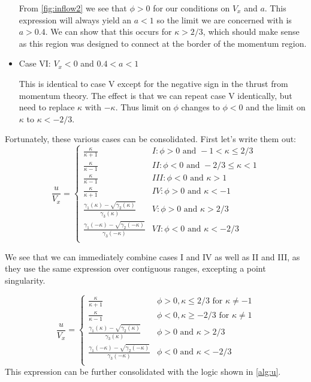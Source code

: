 \documentclass{article}
\begin{document}
\begin{itemize}
From \cref{fig:inflow2} we see that $\phi > 0$ for our conditions on $V_x$ and $a$.  This expression will always yield an $a < 1$ so the limit we are concerned with is $a > 0.4$.  We can show that this occurs for $\kappa > 2/3$, which should make sense as this region was designed to connect at the border of the momentum region.


\item Case VI: $V_x < 0$ and $0.4 < a < 1$

This is identical to case V except for the negative sign in the thrust from momentum theory.  The effect is that we can repeat case V identically, but need to replace $\kappa$ with $-\kappa$.  Thus limit on $\phi$ changes to $\phi < 0$ and the limit on $\kappa$ to $\kappa < -2/3$.

\end{itemize}

Fortunately, these various cases can be consolidated.  First let's write them out:
\begin{equation}
    \frac{u}{V_x} =
    \begin{cases}
        \frac{\kappa}{\kappa + 1} & I: \phi > 0 \text{ and } -1 < \kappa \le 2/3 \\
        \frac{\kappa}{\kappa - 1} & II: \phi < 0 \text{ and } -2/3 \le \kappa < 1 \\
        \frac{\kappa}{\kappa - 1} & III: \phi < 0 \text{ and } \kappa > 1 \\
        \frac{\kappa}{\kappa + 1} & IV: \phi > 0 \text{ and } \kappa < -1 \\
        \frac{\gamma_1(\kappa) - \sqrt{\gamma_2(\kappa)}}{\gamma_3(\kappa)} & V: \phi > 0 \text{ and } \kappa > 2/3 \\
        \frac{\gamma_1(-\kappa) - \sqrt{\gamma_2(-\kappa)}}{\gamma_3(-\kappa)} & VI: \phi < 0 \text{ and } \kappa < -2/3 \\
    \end{cases}
\end{equation}

We see that we can immediately combine cases I and IV as well as II and III, as they use the same expression over contiguous ranges, excepting a point singularity.

\begin{equation}
    \frac{u}{V_x} =
    \begin{cases}
        \frac{\kappa}{\kappa + 1} & \phi > 0, \kappa \le 2/3 \text{ for } \kappa \ne -1\\
        \frac{\kappa}{\kappa - 1} & \phi < 0, \kappa \ge -2/3 \text{ for } \kappa \ne 1\\
        \frac{\gamma_1(\kappa) - \sqrt{\gamma_2(\kappa)}}{\gamma_3(\kappa)} & \phi > 0 \text{ and } \kappa > 2/3 \\
        \frac{\gamma_1(-\kappa) - \sqrt{\gamma_2(-\kappa)}}{\gamma_3(-\kappa)} & \phi < 0 \text{ and } \kappa < -2/3 \\
    \end{cases}
    \label{eq:asing}
\end{equation}
This expression can be further consolidated with the logic shown in \cref{alg:u}.
\end{document}
